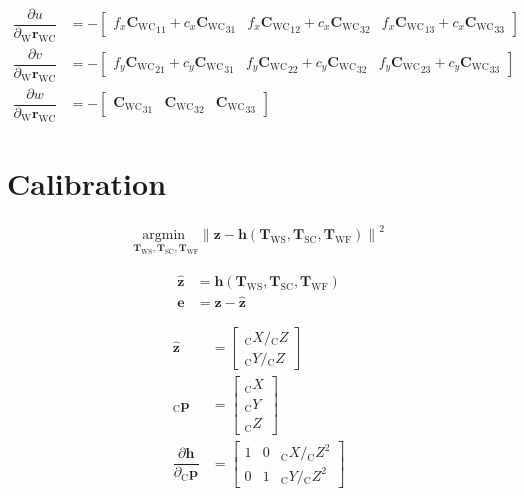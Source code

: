 \documentclass{article}
\renewcommand{\Vec}[1]{{\mathbf{#1}}}
\newcommand{\Mat}[1]{{\mathbf{#1}}}
\newcommand{\Norm}[1]{{\|#1\|}}
\newcommand{\Argmin}[1]{\underset{#1}{{\text{argmin }}}}
\newcommand{\tf}{\mathbf{T}}
\newcommand{\cam}{{\text{C}}}
\newcommand{\sensor}{{\text{S}}}
\newcommand{\world}{{\text{W}}}
\newcommand{\fiducial}{{\text{F}}}
\newcommand{\KineNotationTransform}[3]{{{#1}_{#2#3}}}
\newcommand{\KineNotation}[3]{{{{}_{#2}} {#1}_{#2#3}}}
\newcommand{\KineNotationPart}[3]{{{{}_{#2}} {#1}_{#3}}}
\newcommand{\KineNotationBare}[2]{{{{}_{#2}} {#1}}}
\newcommand{\pos}{{\Vec{r}}}
\newcommand{\Pos}[2]{{\KineNotation{\pos}{#1}{#2}}}
\newcommand{\rot}{{\Mat{C}}}
\newcommand{\Rot}[2]{{\KineNotationTransform{\rot}{#1}{#2}}}
\newcommand{\tf}{{\Mat{T}}}
\newcommand{\Tf}[2]{{\KineNotationTransform{\tf}{#1}{#2}}}
\newcommand{\point}{\Vec{p}}
\newcommand{\Pt}[1]{{\KineNotationPart{\point}{#1}{}}}
\newcommand{\Point}[2]{{\KineNotationBare{\point}{#1}}}
\newcommand{\camRot}{{\Rot{\world}{\cam}}}
\newcommand{\camPos}{{\Pos{\world}{\cam}}}
\newcommand{\projFunc}{{\Vec{h}}}
\newcommand{\measurement}{{\Vec{z}}}
\begin{document}
\begin{align}
  \dfrac{\partial{u}}{\partial{\camPos}} &=
    -\begin{bmatrix}
      f_{x} \camRot_{11} + c_{x} \camRot_{31} &
      f_{x} \camRot_{12} + c_{x} \camRot_{32} &
      f_{x} \camRot_{13} + c_{x} \camRot_{33}
    \end{bmatrix} \\
  \dfrac{\partial{v}}{\partial{\camPos}} &=
    -\begin{bmatrix}
      f_{y} \camRot_{21} + c_{y} \camRot_{31} &
      f_{y} \camRot_{22} + c_{y} \camRot_{32} &
      f_{y} \camRot_{23} + c_{y} \camRot_{33}
    \end{bmatrix} \\
  \dfrac{\partial{w}}{\partial{\camPos}} &=
    -\begin{bmatrix}
      \camRot_{31} &
      \camRot_{32} &
      \camRot_{33}
    \end{bmatrix}
\end{align}



\newpage
\section{Calibration}

\begin{align}
  \Argmin{\Tf{\world}{\sensor}, \Tf{\sensor}{\cam}, \Tf{\world}{\fiducial}}
  \Norm{
    \measurement
    - \projFunc(\Tf{\world}{\sensor}, \Tf{\sensor}{\cam}, \Tf{\world}{\fiducial})
  }^{2}
\end{align}

\begin{align}
  \hat{\measurement} &=
    \projFunc(\Tf{\world}{\sensor},
              \Tf{\sensor}{\cam},
              \Tf{\world}{\fiducial}) \\
  \Vec{e} &= \measurement - \hat{\measurement}
\end{align}

\begin{align}
  \hat{\measurement}
  &=
  \begin{bmatrix}
    \KineNotationBare{X}{\cam} / \KineNotationBare{Z}{\cam} \\
    \KineNotationBare{Y}{\cam} / \KineNotationBare{Z}{\cam}
  \end{bmatrix} \\
  \Point{\cam}{\fiducial_{i}}
  &=
  \begin{bmatrix}
    \KineNotationBare{X}{\cam} \\
    \KineNotationBare{Y}{\cam} \\
    \KineNotationBare{Z}{\cam}
  \end{bmatrix} \\
  \dfrac{\partial{\projFunc}}{\partial{\Pt{\cam}}}
  &=
  \begin{bmatrix}
    1 & 0 & \KineNotationBare{X}{\cam} / \KineNotationBare{Z}{\cam}^{2} \\
    0 & 1 & \KineNotationBare{Y}{\cam} / \KineNotationBare{Z}{\cam}^{2}
  \end{bmatrix}
\end{align}
\end{document}

